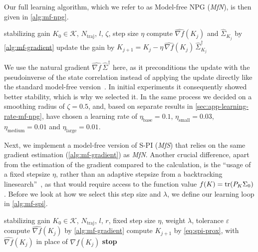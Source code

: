 Our full learning algorithm, which we refer to as Model-free NPG (\emph{MfN}), is then given in \cref{alg:mf-npg}.
\begin{algorithm}[htbp]
    \caption{Model-free NPG}
    \label{alg:mf-npg}
    \begin{algorithmic}[1]
        \REQUIRE stabilizing gain $K_0 \in \mathcal{K}$, $N_{\mathrm{traj}}$, $l$, $\zeta$, step size $\eta$
            \STATE compute $\widehat{\nabla f}(K_j)$ and $\hat{\Sigma}_{K_j}$ by \cref{alg:mf-gradient}
            \STATE update the gain by $K_{j+1} = K_j - \eta \, \widehat{\nabla f}(K_j) \, \hat{\Sigma}_{K_j}^{\dagger}$
        \ENDFOR
    \end{algorithmic}
\end{algorithm}

We use the natural gradient $\widehat{\nabla f} \, \hat{\Sigma}^{\dagger}$ here, as it
preconditions the update with the pseudoinverse of the state correlation instead of applying
the update directly like the standard model-free version~\cite{Fazel2018Global}. In initial
experiments it consequently showed better stability, which is why we selected it.
In the same process we decided on a smoothing radius of $\zeta = 0.5$, and, based
on separate results in \cref{sec:app-learning-rate-mf-npg}, have chosen a learning rate of $\eta_{\mathrm{base}} = 0.1$,
$\eta_{\mathrm{small}} = 0.03$, $\eta_{\mathrm{medium}} = 0.01$ and $\eta_{\mathrm{large}} = 0.01$.

Next, we implement a model-free version of S-PI (\emph{MfS}) that relies on the same gradient
estimation (\cref{alg:mf-gradient}) as \emph{MfN}. Another crucial difference,
apart from the estimation of the gradient compared to the calculation, is the ``usage of a fixed stepsize
$\eta$, rather than an adaptive stepsize from a backtracking linesearch''~\cite[Sec.~3.1]{Park2020Structured}, as that
would require access to the function value $f(K) = \operatorname{tr}(P_K \Sigma_0)$. Before we look at how we select this step size
and $\lambda$, we define our learning loop in \cref{alg:mf-spi}.
\begin{algorithm}[htbp]
    \caption{S-PI (model-free)}
    \label{alg:mf-spi}
    \begin{algorithmic}[1]
        \REQUIRE stabilizing gain $K_0 \in \mathcal{K}$, $N_{\mathrm{traj}}$, $l$, $r$, fixed step size $\eta$, weight $\lambda$,
        tolerance $\varepsilon$
            \STATE compute $\widehat{\nabla f}(K_j)$ by \cref{alg:mf-gradient}
            \STATE compute $K_{j+1}$ by \eqref{eq:spi-prox}, with $\widehat{\nabla f}(K_j)$ in place of $\nabla f(K_j)$
                \STATE \textbf{stop}
            \ENDIF
        \ENDFOR
    \end{algorithmic}
\end{algorithm}

